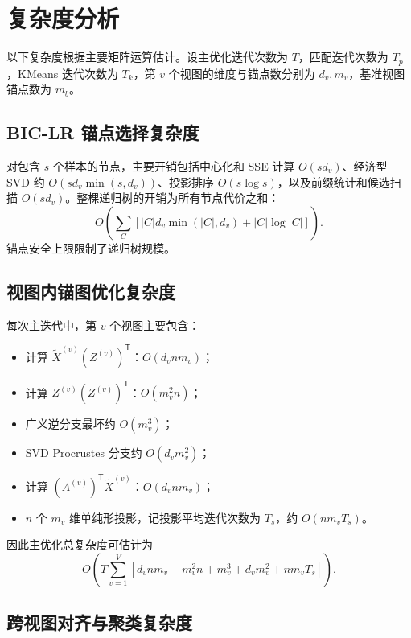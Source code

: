 \documentclass[UTF8,a4paper,12pt,fontset=none]{ctexart}
\newcommand{\T}{\mathsf{T}}
\begin{document}
\section{复杂度分析}

以下复杂度根据主要矩阵运算估计。设主优化迭代次数为 \(T\)，匹配迭代次数为 \(T_p\)，KMeans 迭代次数为 \(T_k\)，第 \(v\) 个视图的维度与锚点数分别为 \(d_v,m_v\)，基准视图锚点数为 \(m_b\)。

\subsection{BIC-LR 锚点选择复杂度}

对包含 \(s\) 个样本的节点，主要开销包括中心化和 SSE 计算 \(O(sd_v)\)、经济型 SVD 约 \(O(sd_v\min(s,d_v))\)、投影排序 \(O(s\log s)\)，以及前缀统计和候选扫描 \(O(sd_v)\)。整棵递归树的开销为所有节点代价之和：
\begin{equation}
O\!\left(
\sum_{C}
\left[
|C|d_v\min(|C|,d_v)
+|C|\log |C|
\right]
\right).
\end{equation}
锚点安全上限限制了递归树规模。

\subsection{视图内锚图优化复杂度}

每次主迭代中，第 \(v\) 个视图主要包含：
\begin{itemize}
  \item 计算 \(\widetilde X^{(v)}(Z^{(v)})^\T\)：\(O(d_vnm_v)\)；
  \item 计算 \(Z^{(v)}(Z^{(v)})^\T\)：\(O(m_v^2n)\)；
  \item 广义逆分支最坏约 \(O(m_v^3)\)；
  \item SVD Procrustes 分支约 \(O(d_vm_v^2)\)；
  \item 计算 \((A^{(v)})^\T\widetilde X^{(v)}\)：\(O(d_vnm_v)\)；
  \item \(n\) 个 \(m_v\) 维单纯形投影，记投影平均迭代次数为 \(T_s\)，约 \(O(nm_vT_s)\)。
\end{itemize}
因此主优化总复杂度可估计为
\begin{equation}
O\!\left(
T\sum_{v=1}^{V}
\left[
d_vnm_v+m_v^2n+m_v^3+d_vm_v^2+nm_vT_s
\right]
\right).
\end{equation}

\subsection{跨视图对齐与聚类复杂度}
\end{document}
